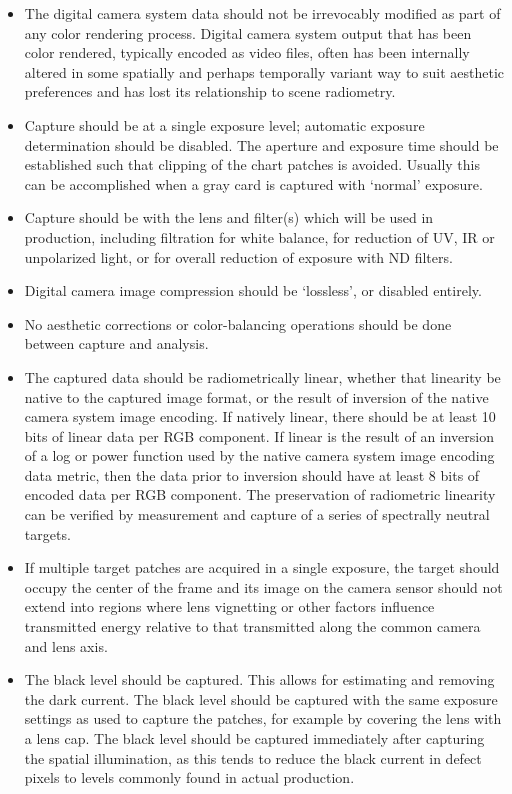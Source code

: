 \begin{itemize}
	\item The digital camera system data should not be irrevocably modified as part of any color rendering process. Digital camera system output that has been color rendered, typically encoded as video files, often has been internally altered in some spatially and perhaps temporally variant way to suit aesthetic preferences and has lost its relationship to scene radiometry. 
	\item Capture should be at a single exposure level; automatic exposure determination should be disabled. The aperture and exposure time should be established such that clipping of the chart patches is avoided. Usually this can be accomplished when a gray card is captured with `normal' exposure.
	\item Capture should be with the lens and filter(s) which will be used in production, including filtration for white balance, for reduction of UV, IR or unpolarized light, or for overall reduction of exposure with ND filters.
	\item Digital camera image compression should be `lossless', or disabled entirely.
	\item No aesthetic corrections or color-balancing operations should be done between capture and analysis.
	\item The captured data should be radiometrically linear, whether that linearity be native to the captured image format, or the result of inversion of the native camera system image encoding. If natively linear, there should be at least 10 bits of linear data per RGB component. If linear is the result of an inversion of a log or power function used by the native camera system image encoding data metric, then the data prior to inversion should have at least 8 bits of encoded data per RGB component. The preservation of radiometric linearity can be verified by measurement and capture of a series of spectrally neutral targets.
	\item If multiple target patches are acquired in a single exposure, the target should occupy the center of the frame and its image on the camera sensor should not extend into regions where lens vignetting or other factors influence transmitted energy relative to that transmitted along the common camera and lens axis.
	\item The black level should be captured. This allows for estimating and removing the dark current. The black level should be captured with the same exposure settings as used to capture the patches, for example by covering the lens with a lens cap. The black level should be captured immediately after capturing the spatial illumination, as this tends to reduce the black current in defect pixels to levels commonly found in actual production.

\end{itemize}
